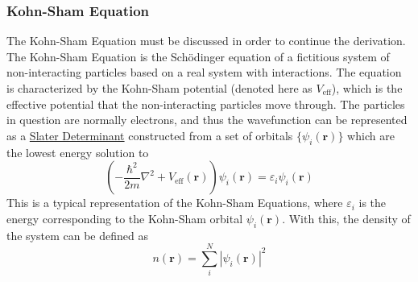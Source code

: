\documentclass[12pt]{article}
\newcommand{\lrp}[1]{\left( #1 \right)}
\begin{document}
\subsubsection{Kohn-Sham Equation} %
The Kohn-Sham Equation \cite{KSeq} must be discussed in order to continue the derivation. The Kohn-Sham Equation is the Sch\"odinger equation of a fictitious system of non-interacting particles based on a real system with interactions. The equation is characterized by the Kohn-Sham potential (denoted here as $V_{\mathrm{eff}}$), which is the effective potential that the non-interacting particles move through. The particles in question are normally electrons, and thus the wavefunction can be represented as a \href{https://en.wikipedia.org/wiki/Slater_determinant}{Slater Determinant} constructed from a set of orbitals $\{\psi_i(\textbf{r})\}$ which are the lowest energy solution to 
\begin{equation}\label{eq:KSeq}
    \lrp{-\frac{\hbar^2}{2m}\nabla^2+ V_{\mathrm{eff}}(\textbf{r})}\psi_i(\textbf{r}) = \varepsilon_i\psi_i(\textbf{r})
\end{equation}
This is a typical representation of the Kohn-Sham Equations, where $\varepsilon_i$ is the energy corresponding to the Kohn-Sham orbital $\psi_i(\textbf{r})$. With this, the density of the system can be defined as 
\begin{equation*}
    n(\textbf{r}) = \sum_i^N |\psi_i(\textbf{r})|^2
\end{equation*}
\end{document}
